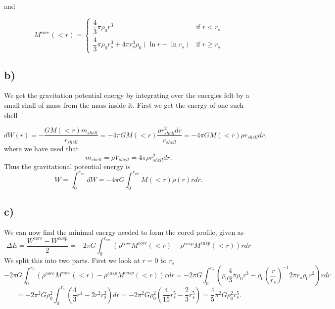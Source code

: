 \documentclass[a4paper,norsk, 10pt]{article}
\begin{document}
and 

\begin{equation}
M^{core}(<r) =
\left\{
	\begin{array}{ll}
		\dfrac{4}{3}\pi \rho_0 r^3  & \mbox{if } r < r_s \\
		\dfrac{4}{3}\pi \rho_0 r_s^3 + 4\pi r_s^3 \rho_0 (\ln r - \ln r_s) & \mbox{if } r \geq r_s
	\end{array}
\right.
\end{equation}

\subsection{b)}

We get the gravitation potential energy by integrating over the energies felt by a small shall of mass from the mass inside it. First we get the energy of one such shell

\begin{equation}
dW(r) = -\frac{GM(<r)m_{shell}}{r_{shell}} = -4\pi G M(<r) \dfrac{\rho r_{shell}^2 dr}{r_{shell}} = -4\pi G M(<r) \rho r_{shell} dr,
\end{equation}
where we have used that 
\begin{equation}
m_{shell} = \rho V_{shell} = 4\pi \rho r_{shell}^2 dr.
\end{equation}
Thus the gravitational potential energy is
\begin{equation}
W = \int_0^{r_{vir}} dW = -4\pi G \int_0^{r_{vir}} M(<r) \rho(r) r dr.
\end{equation}


\subsection{c)}
We can now find the minimal energy needed to form the cored profile, given as 
\begin{equation}
\Delta E = \dfrac{W^{core} - W^{cusp}}{2} = -2\pi G\int_0^{r_{vir}} \left(\rho^{core}M^{core}(<r) - \rho^{cusp}M^{cusp}(<r)\right) r dr
\end{equation}
We split this into two parts. First we look at $r=0$ to $r_s$
\begin{equation}
-2\pi G \int_0^{r_{s}} \left(\rho^{core}M^{core}(<r) - \rho^{cusp}M^{cusp}(<r)\right) r dr = -2\pi G\int_0^{r_{s}} \left(\rho_0\dfrac{4}{3}\pi \rho_0 r^3 - \rho_0\left(\dfrac{r}{r_s}\right)^{-1}2\pi r_s \rho_0 r^2\right) r dr 
\end{equation}
\begin{equation}
= -2\pi^2G \rho_0^2 \int_0^{r_{s}}( \frac{4}{3}r^4 - 2r^2 r_s^2)dr = -2\pi^2G \rho_0^2 ( \frac{4}{15}r_s^5 - \frac{2}{3} r_s^5) = \frac{4}{5}\pi^2G \rho_0^2 r_s^5.
\end{equation}
\end{document}
